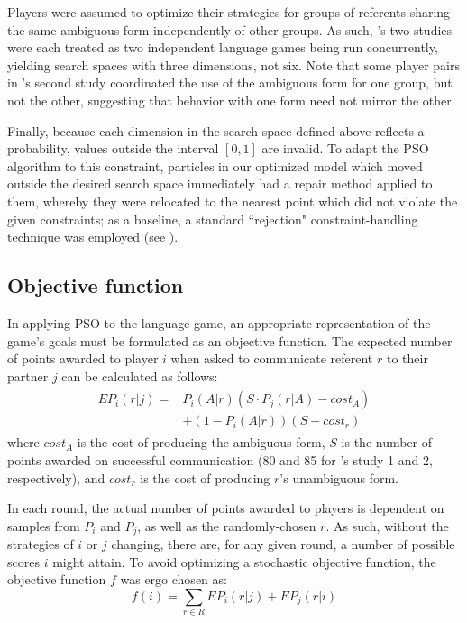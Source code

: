 \documentclass[a4paper,11pt]{article}
\begin{document}
Players were assumed to optimize their strategies for groups of referents sharing the same ambiguous form independently of other groups. As such, \citeauthor{rohde2012}'s two studies were each treated as two independent language games being run concurrently, yielding search spaces with three dimensions, not six. Note that some player pairs in \citeauthor{rohde2012}'s second study coordinated the use of the ambiguous form for one group, but not the other, suggesting that behavior with one form need not mirror the other.

Finally, because each dimension in the search space defined above reflects a probability, values outside the interval $[0, 1]$ are invalid. To adapt the PSO algorithm to this constraint, particles in our optimized model which moved outside the desired search space immediately had a repair method applied to them, whereby they were relocated to the nearest point which did not violate the given constraints; as a baseline, a standard ``rejection" constraint-handling technique was employed (see ).
 
\subsection{Objective function}
\label{sec:objective_func}
In applying PSO to the \citeauthor{rohde2012} language game, an appropriate representation of the game's goals must be formulated as an objective function. The expected number of points awarded to player $i$ when asked to communicate referent $r$ to their partner $j$ can be calculated as follows:
\begin{multline}
\begin{split}
EP_{i}(r|j) = & P_i(A|r)(S \cdot P_j(r|A) - cost_A) \\
              & + (1 - P_i(A|r))(S - cost_r) 
\end{split}
\end{multline}
where $cost_A$ is the cost of producing the ambiguous form, $S$ is the number of points awarded on successful communication (80 and 85 for \citeauthor{rohde2012}'s study 1 and 2, respectively), and $cost_r$ is the cost of producing $r$'s unambiguous form.

In each round, the actual number of points awarded to players is dependent on samples from $P_i$ and $P_j$, as well as the randomly-chosen $r$. As such, without the strategies of $i$ or $j$ changing, there are, for any given round, a number of possible scores $i$ might attain. To avoid optimizing a stochastic objective function, the objective function $f$ was ergo chosen as:
\begin{equation}
f(i) = \sum_{r \in R} EP_{i}(r|j) + EP_{j}(r|i)
\end{equation}
\end{document}
